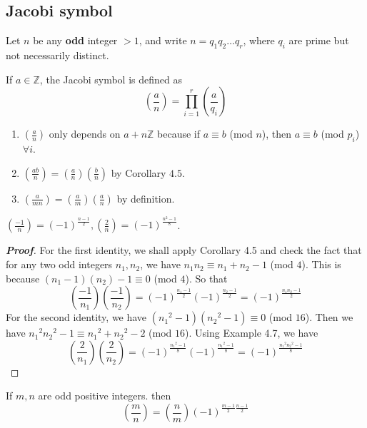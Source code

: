 \subsection{Jacobi symbol}
Let $n$ be any {\bf odd} integer $>1$, and write $n=q_1 q_2 \ldots q_r$, where $q_i$ are prime but not necessarily distinct.
\begin{definition} If $a \in \mathbb{Z}$, the Jacobi symbol is defined as
$$\left(\frac{a}{n}\right)=\prod_{i=1}^{r}\left(\frac{a}{q_i}\right)$$
\end{definition}
\begin{remark}
\begin{enumerate}
\item $(\frac{a}{n})$ only depends on $a+n\mathbb{Z}$ because if $a \equiv b$ (mod $n$), then
$a \equiv b$ (mod $p_i$) $\forall i$.
\item $(\frac{ab}{n})=(\frac{a}{n})(\frac{b}{n})$ by Corollary $4.5$.
\item $(\frac{a}{mn})=(\frac{a}{m})(\frac{a}{n})$ by definition.
\end{enumerate}
\end{remark}
\begin{lemma} $(\frac{-1}{n})=(-1)^{\frac{n-1}{2}},(\frac{2}{n})=(-1)^{\frac{n^2-1}{8}}$.
\end{lemma}
\begin{proof}[\bf Proof] For the first identity, we shall apply Corollary 4.5 and check the fact that for any two odd integers $n_1,n_2$, we have $n_1 n_2 \equiv n_1+n_2-1$ (mod $4$). This is because
$(n_1-1)(n_2)-1 \equiv 0$ (mod $4$). So that
$$\left(\frac{-1}{n_1}\right)\left(\frac{-1}{n_2}\right)=(-1)^{\frac{n_1-1}{2}}(-1)^{\frac{n_2-1}{2}}
=(-1)^{\frac{n_1 n_2 -1}{2}}$$
For the second identity, we have $({n_1}^2-1)({n_2}^2-1) \equiv 0$ (mod $16$). Then we have
${n_1}^2{n_2}^2-1 \equiv {n_1}^2+{n_2}^2-2$ (mod $16$).
Using Example 4.7, we have
$$\left(\frac{2}{n_1}\right)\left(\frac{2}{n_2}\right)
=(-1)^{\frac{{n_1}^2-1}{8}}(-1)^{\frac{{n_1}^2-1}{8}}=(-1)^{\frac{{n_1}^2{n_2}^2-1}{8}}$$
\end{proof}
\begin{theorem} If $m,n$ are odd positive integers. then
$$\left(\frac{m}{n}\right)=\left(\frac{n}{m}\right)(-1)^{\frac{m-1}{2} \frac{n-1}{2}}$$
\end{theorem}
